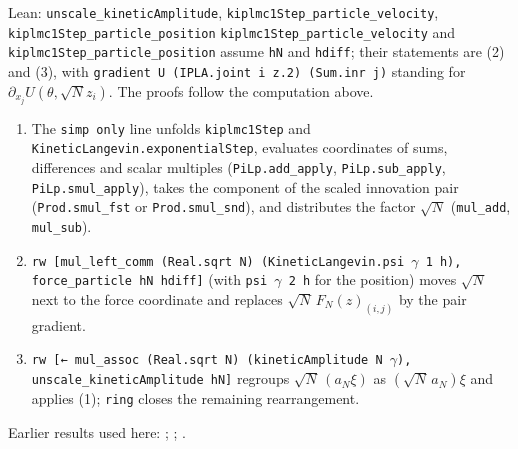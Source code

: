 \documentclass[11pt,a4paper]{article}
\begin{document}
\begin{leanbox}{Lean: \texttt{unscale\_\allowbreak{}kineticAmplitude}, \texttt{kiplmc1Step\_\allowbreak{}particle\_\allowbreak{}velocity}, \texttt{kiplmc1Step\_\allowbreak{}particle\_\allowbreak{}position}}
\texttt{kiplmc1\allowbreak{}Step\_\allowbreak{}particle\_\allowbreak{}velocity} and \texttt{kiplmc1\allowbreak{}Step\_\allowbreak{}particle\_\allowbreak{}position} assume \texttt{h\allowbreak{}N} and \texttt{hdiff}; their statements are (2) and (3), with \texttt{gradient U (IPLA.\allowbreak{}joint i z.\allowbreak{}2) (Sum.\allowbreak{}inr j)} standing for \(\partial_{x_j}U(\theta,\sqrt Nz_i)\). The proofs follow the computation above.



\begin{enumerate}


\item The \texttt{simp only} line unfolds \texttt{kiplmc1\allowbreak{}Step} and \texttt{Kinetic\allowbreak{}Langevin.\allowbreak{}exponential\allowbreak{}Step}, evaluates coordinates of sums, differences and scalar multiples (\texttt{Pi\allowbreak{}Lp.\allowbreak{}add\_\allowbreak{}apply}, \texttt{Pi\allowbreak{}Lp.\allowbreak{}sub\_\allowbreak{}apply}, \texttt{Pi\allowbreak{}Lp.\allowbreak{}smul\_\allowbreak{}apply}), takes the component of the scaled innovation pair (\texttt{Prod.\allowbreak{}smul\_\allowbreak{}fst} or \texttt{Prod.\allowbreak{}smul\_\allowbreak{}snd}), and distributes the factor \(\sqrt N\) (\texttt{mul\_\allowbreak{}add}, \texttt{mul\_\allowbreak{}sub}).

\item \texttt{rw [mul\_\allowbreak{}left\_\allowbreak{}comm (Real.\allowbreak{}sqrt N) (Kinetic\allowbreak{}Langevin.\allowbreak{}psi \ensuremath{\gamma} 1 h), force\_\allowbreak{}particle h\allowbreak{}N hdiff]} (with \texttt{psi \ensuremath{\gamma} 2 h} for the position) moves \(\sqrt N\) next to the force coordinate and replaces \(\sqrt N\,F_N(z)_{(i,j)}\) by the pair gradient.

\item \texttt{rw [← mul\_\allowbreak{}assoc (Real.\allowbreak{}sqrt N) (kinetic\allowbreak{}Amplitude N \ensuremath{\gamma}), unscale\_\allowbreak{}kinetic\allowbreak{}Amplitude h\allowbreak{}N]} regroups \(\sqrt N\,(a_N\xi)\) as \((\sqrt N\,a_N)\xi\) and applies (1); \texttt{ring} closes the remaining rearrangement.

\end{enumerate}
\end{leanbox}


Earlier results used here: \cite[Section~3.1.1]{LangevinLean2026IPLA}; \cite[Section~3.10.1]{LangevinLean2026Kinetic}; \cite[Section~3.12.2]{LangevinLean2026Kinetic}.
\end{document}
